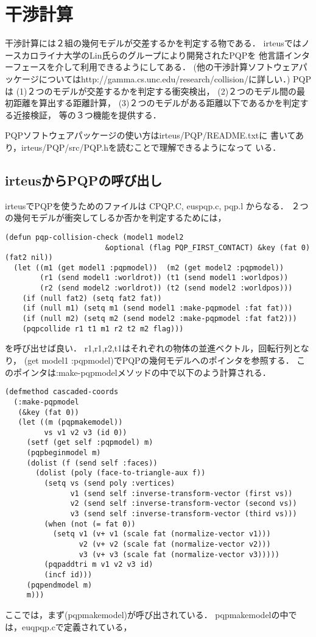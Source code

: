 \section{干渉計算}

干渉計算には２組の幾何モデルが交差するかを判定する物である．
irteusではノースカロライナ大学のLin氏らのグループにより開発されたPQPを
他言語インターフェースを介して利用できるようにしてある．
(他の干渉計算ソフトウェアパッケージについてはhttp://gamma.cs.unc.edu/research/collision/に詳しい．)
PQPは
(1)２つのモデルが交差するかを判定する衝突検出，
(2)２つのモデル間の最初距離を算出する距離計算，
(3)２つのモデルがある距離以下であるかを判定する近接検証，
等の３つ機能を提供する．

PQPソフトウェアパッケージの使い方はirteus/PQP/README.txtに
書いてあり，irteus/PQP/src/PQP.hを読むことで理解できるようになって
いる．

\subsection{irteusからPQPの呼び出し}

irteusでPQPを使うためのファイルは
CPQP.C, euspqp.c, pqp.l
からなる．
２つの幾何モデルが衝突してしるか否かを判定するためには，

{\baselineskip=10pt
\begin{verbatim}
(defun pqp-collision-check (model1 model2
				       &optional (flag PQP_FIRST_CONTACT) &key (fat 0) (fat2 nil))
  (let ((m1 (get model1 :pqpmodel))  (m2 (get model2 :pqpmodel))
        (r1 (send model1 :worldrot)) (t1 (send model1 :worldpos))
        (r2 (send model2 :worldrot)) (t2 (send model2 :worldpos)))
    (if (null fat2) (setq fat2 fat))
    (if (null m1) (setq m1 (send model1 :make-pqpmodel :fat fat)))
    (if (null m2) (setq m2 (send model2 :make-pqpmodel :fat fat2)))
    (pqpcollide r1 t1 m1 r2 t2 m2 flag)))
\end{verbatim}
}
を呼び出せば良い．
r1,r1,r2,t1はそれぞれの物体の並進ベクトル，回転行列となり，
(get model1 :pqpmodel)でPQPの幾何モデルへのポインタを参照する．
このポインタは:make-pqpmodelメソッドの中で以下のよう計算される．
{\baselineskip=10pt
\begin{verbatim}
(defmethod cascaded-coords
  (:make-pqpmodel
   (&key (fat 0))
   (let ((m (pqpmakemodel))
         vs v1 v2 v3 (id 0))
     (setf (get self :pqpmodel) m)
     (pqpbeginmodel m)
     (dolist (f (send self :faces))
       (dolist (poly (face-to-triangle-aux f))
         (setq vs (send poly :vertices)
               v1 (send self :inverse-transform-vector (first vs))
               v2 (send self :inverse-transform-vector (second vs))
               v3 (send self :inverse-transform-vector (third vs)))
         (when (not (= fat 0))
           (setq v1 (v+ v1 (scale fat (normalize-vector v1)))
                 v2 (v+ v2 (scale fat (normalize-vector v2)))
                 v3 (v+ v3 (scale fat (normalize-vector v3)))))
         (pqpaddtri m v1 v2 v3 id)
         (incf id)))
     (pqpendmodel m)
     m)))
\end{verbatim}
}
ここでは，まず(pqpmakemodel)が呼び出されている．
pqpmakemodelの中では，euqpqp.cで定義されている，

